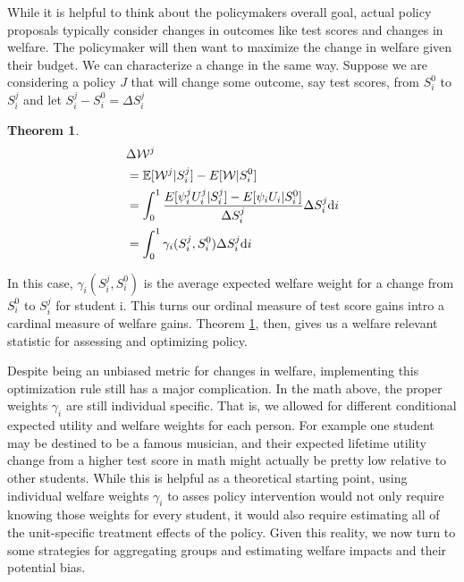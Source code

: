 \documentclass[12pt]{article}
\theoremstyle{definition}
\theoremstyle{definition}
\theoremstyle{definition}
\theoremstyle{definition}
\newtheorem{thm}{Theorem}
\begin{document}
   While it is helpful to think about the policymakers overall goal, actual policy proposals typically consider changes in outcomes like test scores and changes in welfare. The policymaker will then want to maximize the change in welfare given their budget. We can characterize a change in the same way. Suppose we are considering a policy $J$ that will change some outcome, say test scores, from $S_i^0$ to $S_i^j$ and let $S_i^j- S_i^0 = \Delta S^j_i$

    \begin{thm}
    \label{def_welfare_change}
    \begin{align}
           &  \Delta \mathcal{W}^j \\
           & = \mathbb{E}[\mathcal{W}^j|S_i^j] - E[\mathcal{W}|S_i^0]  \\
           &  = \int_0^1 \frac{E[\psi^j_i U^j_i |S_i^j] - E[\psi_i U_i |S_i^0]}{\Delta S^j_i} \Delta S^j_i\text{d}i \\ 
          &   = \int_0^1 \gamma_i(S_i^j, S_i^0) \Delta S^j_i \text{d}i
    \end{align}
    \end{thm}

   
 
    In this case, $\gamma_i(S_i^j, S_i^0) $ is the average expected welfare weight for a change from $S_i^0$ to $S_i^j$ for student i. This turns our ordinal measure of test score gains intro a cardinal measure of welfare gains. Theorem \ref{def_welfare_change}, then, gives us a welfare relevant statistic for assessing and optimizing policy.

 Despite being an unbiased metric for changes in welfare, implementing this optimization rule still has a major complication. In the math above, the proper weights  $\gamma_i$ are still individual specific. That is, we allowed for different conditional expected utility and welfare weights for each person. For example one student may be destined to be a famous musician, and their expected lifetime utility change from a higher test score in math might actually be pretty low relative to other students. While this is helpful as a theoretical starting point, using individual welfare weights  $\gamma_i$ to asses policy intervention would not only require knowing those weights for every student, it would also require estimating all of the unit-specific treatment effects of the policy. Given this reality, we now turn to some strategies for aggregating groups and estimating welfare impacts and their potential bias. 
    
\end{document}
